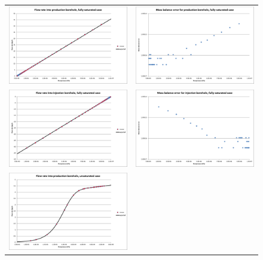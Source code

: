 \documentclass[]{scrreprt}
\begin{document}
\begin{figure}[htb]
\centering
\begin{tabular}{cc}
\includegraphics[width=7cm]{bh02.eps} &
\includegraphics[width=7cm]{bh02_mass_balance.eps} \\
\includegraphics[width=7cm]{bh03.eps} &
\includegraphics[width=7cm]{bh03_mass_balance.eps} \\
\includegraphics[width=7cm]{bh04.eps} &

\end{tabular}
\end{figure}
\end{document}
